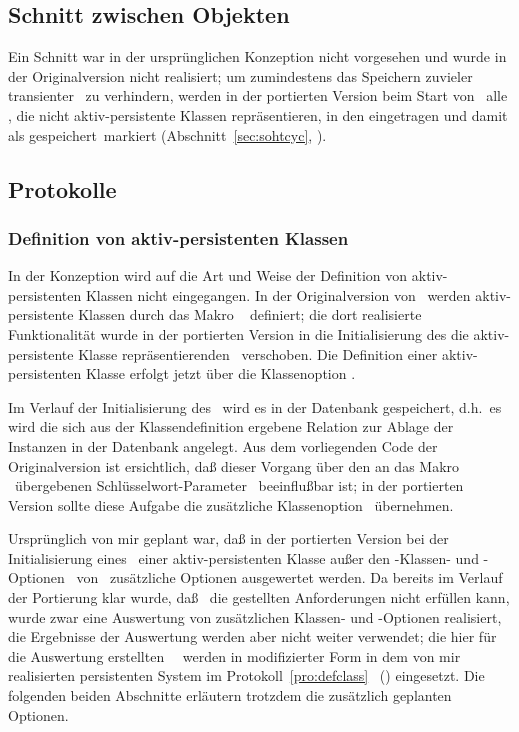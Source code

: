 \subsection{Schnitt zwischen Objekten}
%
Ein Schnitt war in der urspr\"{u}nglichen Konzeption nicht vorgesehen und
wurde in der Originalversion nicht realisiert; um zumindestens das
Speichern zuvieler transienter \clsmo[e]\ zu verhindern, werden in der
portierten Version beim Start von \soh\ alle \clsmo[e], die nicht
aktiv-persistente Klassen repr\"{a}sentieren, in den \cache\/ eingetragen
und damit als \rglq{}gespeichert\rgrq\ markiert
(Abschnitt~\ref{sec:sohtcyc}, \citepage{\pageref{sec:sohtcyc}}).
%
\subsection{Protokolle}%
\label{sec:sohpr}%
%
\subsubsection{Definition von aktiv-persistenten Klassen}%
%
In der Konzeption wird auf die Art und Weise der Definition von
aktiv-persistenten Klassen nicht eingegangen.  In der Originalversion
von \soh\ werden aktiv-persistente Klassen durch das Makro
\ \cite[]{bib:scha90} definiert; die
dort realisierte Funktionalit\"{a}t wurde in der portierten Version in
die Initialisierung des die aktiv-persistente Klasse
repr\"{a}sentierenden \clsmo[es]\ verschoben.  Die Definition einer
aktiv-persistenten Klasse erfolgt jetzt \"{u}ber die Klassenoption
.
%
\par{}Im Verlauf der Initialisierung des \clsmo[es]\ wird es in der
Datenbank gespeichert, d.h.\ es wird die sich aus der
Klassendefinition ergebene Relation zur Ablage der Instanzen in
der Datenbank angelegt. Aus dem vorliegenden Code der Originalversion
ist ersichtlich, da\ss{} dieser Vorgang \"{u}ber den an das Makro
\ \"{u}bergebenen Schl\"{u}sselwort-Parameter 
\ beeinflu\ss{}bar ist; in der portierten Version
sollte diese Aufgabe die zus\"{a}tzliche Klassenoption
\ \"{u}bernehmen.
%
\par{}Urspr\"{u}nglich von mir geplant war, da\ss{} in der portierten
Version bei der Initialisierung 
eines \clsmo[es]\ einer aktiv-persistenten Klasse au\ss{}er den
\std-Klassen- und \Slt\/-Optionen \ von
\soh\ zus\"{a}tzliche Optionen ausgewertet werden. Da bereits im Verlauf
der Portierung klar wurde, da\ss{} \soh\ die gestellten Anforderungen
nicht erf\"{u}llen kann, wurde zwar eine Auswertung von zus\"{a}tzlichen
Klassen- und \Slt\/-Optionen realisiert, die Ergebnisse der Auswertung
werden aber nicht weiter verwendet; die hier f\"{u}r die Auswertung
erstellten \spc[n]\ \mtd[n]\ werden in modifizierter Form in dem von mir
realisierten persistenten System im Protokoll~\ref{pro:defclass}
\ (\citepage{\pageref{pro:defclass}}) eingesetzt. Die
folgenden beiden Abschnitte erl\"{a}utern trotzdem die zus\"{a}tzlich
geplanten Optionen.
%
